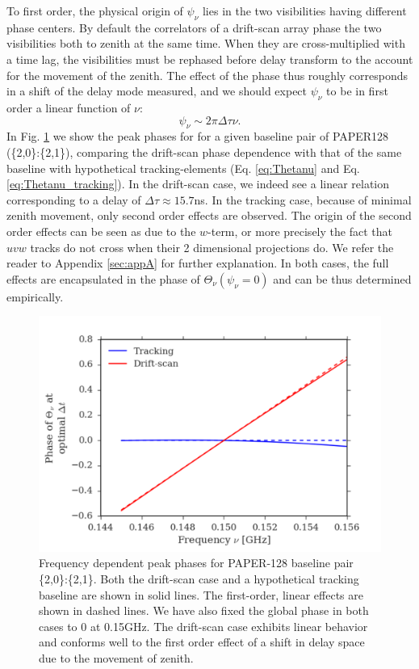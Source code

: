 \documentclass[twocolumn,apj,numberedappendix]{emulateapj}
\renewcommand\[{\begin{equation}}
\renewcommand\]{\end{equation}}
\begin{document}
To first order, the physical origin of $\psi_\nu$ lies in the two visibilities having different phase centers. By default the correlators of a drift-scan array phase the two visibilities both to zenith at the same time. When they are cross-multiplied with a time lag, the visibilities must be rephased before delay transform to the account for the movement of the zenith. The effect of the phase thus roughly corresponds in a shift of the delay mode measured, and we should expect $\psi_{\nu}$ to be in first order a linear function of $\nu$:
\[
\psi_{\nu}\sim 2\pi\Delta\tau\nu.
\]
In Fig. \ref{fig:phi_nu} we show the peak phases for for a given baseline pair of PAPER128 (\{2,0\}:\{2,1\}), comparing the drift-scan phase dependence with that of the same baseline with hypothetical tracking-elements (Eq. \eqref{eq:Thetanu} and Eq. \eqref{eq:Thetanu_tracking}). In the drift-scan case, we indeed see a linear relation corresponding to a delay of $\Delta\tau\approx15.7$ns. In the tracking case, because of minimal zenith movement, only second order effects are observed. The origin of the second order effects can be seen as due to the $w$-term, or more precisely the fact that $uvw$ tracks do not cross when their 2 dimensional projections do. We refer the reader to Appendix \ref{sec:appA} for further explanation. In both cases, the full effects are encapsulated in the phase of $\Theta_\nu(\psi_\nu=0)$ and can be thus determined empirically. 

\begin{figure}[H]
\includegraphics[width=1\linewidth]{phi_nu}

\caption{Frequency dependent peak phases for PAPER-128 baseline pair \{2,0\}:\{2,1\}. Both the drift-scan case and a hypothetical tracking baseline are shown in solid lines. The first-order, linear effects are shown in dashed lines. We have also fixed the global phase in both cases to 0 at 0.15GHz. The drift-scan case exhibits linear behavior and conforms well to the first order effect of a shift in delay space due to the movement of zenith. }
\label{fig:phi_nu}
\end{figure}
\end{document}
